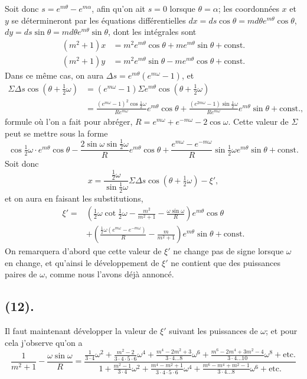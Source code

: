 \documentclass{article}
\begin{document}
Soit donc $s=e^{m\theta}-e^{m\alpha}$, afin qu'on ait $s=0$ lorsque $\theta=\alpha$; les coordonnées $x$ et $y$ se détermineront par les équations différentielles $dx=ds\cos\theta=md\theta e^{m\theta}\cos\theta$, $dy=ds\sin\theta=md\theta e^{m\theta}\sin\theta$, dont les intégrales sont
\[ \begin{aligned} (m^{2}+1)x&=m^{2}e^{m\theta}\cos\theta+me^{m\theta}\sin\theta+\text{const.}\\ (m^{2}+1)y&=m^{2}e^{m\theta}\sin\theta-me^{m\theta}\cos\theta+\text{const.} \end{aligned} \]
Dans ce même cas, on aura $\Delta s=e^{m\theta}(e^{m\omega}-1)$, et
\[ \begin{aligned} \Sigma\Delta s\cos(\theta+\tfrac{1}{2}\omega)&=(e^{m\omega}-1)\Sigma e^{m\theta}\cos(\theta+\tfrac{1}{2}\omega)\\ &=\frac{(e^{m\omega}-1)^{2}\cos\frac{1}{2}\omega}{Re^{m\omega}}e^{m\theta}\cos\theta+\frac{(e^{2m\omega}-1)\sin\frac{1}{2}\omega}{Re^{m\omega}}e^{m\theta}\sin\theta+\text{const.}, \end{aligned} \]
formule où l'on a fait pour abréger, $R=e^{m\omega}+e^{-m\omega}-2\cos\omega$. Cette valeur de $\Sigma$ peut se mettre sous la forme
\[ \cos\tfrac{1}{2}\omega\cdot e^{m\theta}\cos\theta-\frac{2\sin\omega\sin\frac{1}{2}\omega}{R}e^{m\theta}\cos\theta+\frac{e^{m\omega}-e^{-m\omega}}{R}\sin\tfrac{1}{2}\omega e^{m\theta}\sin\theta+\text{const.} \]
Soit donc
\[ x=\frac{\frac{1}{2}\omega}{\sin\frac{1}{2}\omega}\Sigma\Delta s\cos(\theta+\tfrac{1}{2}\omega)-\xi', \]
et on aura en faisant les substitutions,
\[ \begin{aligned} \xi'={}&\left(\tfrac{1}{2}\omega\cot\tfrac{1}{2}\omega-\frac{m^{2}}{m^{2}+1}-\frac{\omega\sin\omega}{R}\right)e^{m\theta}\cos\theta\\ &+\left(\frac{\frac{1}{2}\omega(e^{m\omega}-e^{-m\omega})}{R}-\frac{m}{m^{2}+1}\right)e^{m\theta}\sin\theta+\text{const.} \end{aligned} \]
On remarquera d'abord que cette valeur de $\xi'$ ne change pas de signe lorsque $\omega$ en change, et qu'ainsi le développement de $\xi'$ ne contient que des puissances paires de $\omega$, comme nous l'avons déjà annoncé.

\subsection*{(12).}

Il faut maintenant développer la valeur de $\xi'$ suivant les puissances de $\omega$; et pour cela j'observe qu'on a
\[ \frac{1}{m^{2}+1}-\frac{\omega\sin\omega}{R}=\frac{\frac{1}{3\cdot4}\omega^{2}+\frac{m^{2}-2}{3\cdot4\cdot5\cdot6}\omega^{4}+\frac{m^{4}-2m^{2}+3}{3\cdot4\ldots8}\omega^{6}+\frac{m^{6}-2m^{4}+3m^{2}-4}{3\cdot4\ldots10}\omega^{8}+\text{etc.}}{1+\frac{m^{2}-1}{3\cdot4}\omega^{2}+\frac{m^{4}-m^{2}+1}{3\cdot4\cdot5\cdot6}\omega^{4}+\frac{m^{6}-m^{4}+m^{2}-1}{3\cdot4\ldots8}\omega^{6}+\text{etc.}} \]
\end{document}
